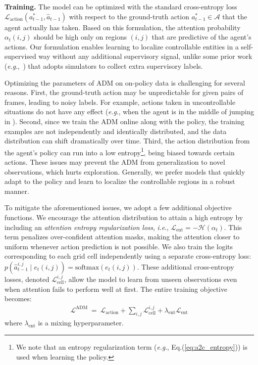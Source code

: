\documentclass{article} \usepackage{iclr,times}
\makeatletter
\newcommand{\ADM}{{ADM}}
\DeclareRobustCommand\onedot{\futurelet\@let@token\@onedot}
\def\onedot{.}
\def\eg{\emph{e.g}\onedot} \def\Eg{\emph{E.g}\onedot}
\def\ie{\emph{i.e}\onedot} \def\Ie{\emph{I.e}\onedot}
\makeatother
\begin{document}
\vspace*{-6pt}
\textbf{Training.}
The model can be optimized with
the standard cross-entropy loss $\mathcal L_\text{action}(a^*_{t-1}, \widehat a_{t-1})$
with respect to the ground-truth action $a^*_{t-1} \in \mathcal{A}$
that the agent actually has taken.
Based on this formulation,
the attention probability $\alpha_t(i, j)$
should be high only on regions $(i, j)$ that are predictive of the agent's actions.
Our formulation enables learning to localize controllable entities in a self-supervised way without any additional supervisory signal, unlike some prior work (\eg,~\citep{Bellemare:AAAI2012:Contingency})
that adopts simulators to collect extra supervisory labels.


Optimizing the parameters of \ADM{} on on-policy data is challenging for several reasons.
First, the ground-truth action may be unpredictable for given pairs of frames, leading to noisy labels.
For example, actions taken in uncontrollable situations do not have any effect
(\eg, when the agent is in the middle of jumping in \MontezumaRevenge).
Second, since we train the \ADM{} online along with the policy, the training examples are not independently and identically distributed, and the data distribution can shift dramatically over time.
Third, the action distribution from the agent's policy can run into a low entropy\footnote{We note that an entropy regularization term (\eg, Eq.(\ref{eq:a2c_entropy})) is used when learning the policy.}, being biased towards certain actions. These issues may prevent the \ADM{} from
generalization to novel observations, which hurts exploration. Generally, we prefer models that quickly adapt to the policy and learn to localize the controllable regions in a robust manner.




To mitigate the aforementioned issues, we adopt a few additional objective functions. We encourage the attention distribution to attain a high entropy
by including an \emph{attention entropy regularization loss}, \ie, $\mathcal L_\text{ent} = -\mathcal H(\alpha_t)$.
This term penalizes over-confident attention masks, making the attention closer to uniform
whenever action prediction is not possible.
We also train the logits corresponding to each grid cell independently using a separate cross-entropy loss:
$p(\widehat a^{i,j}_{t-1} \mid e_t(i,j)) = \mathrm{softmax}(e_t(i,j))$.
These additional cross-entropy losses, denoted $\mathcal L_\text{cell}^{i,j}$, allow the model to learn from unseen observations even when attention fails to perform well at first.
The entire training objective becomes:
\begin{align}
    \label{eq:loss_ADM}
    \mathcal L^\text{ADM} ~=~ \mathcal L_\text{action} + \textstyle\sum_{i,j} \mathcal L_\text{cell}^{i,j} + \lambda_\text{ent} \mathcal L_\text{ent} \end{align}
where $\lambda_\text{ent}$ is a mixing hyperparameter.
\end{document}
